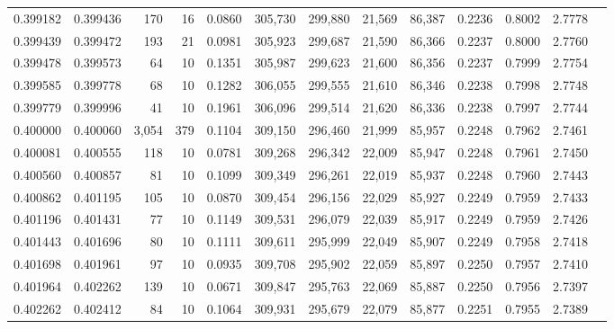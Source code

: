 \begin{tabular}{rrrrrrrrrrrrr}
0.399182 & 0.399436 &   170 &  16 &                                     0.0860 & 305,730 & 299,880 &  21,569 &  86,387 & 0.2236 & 0.8002 & 2.7778 \\
0.399439 & 0.399472 &   193 &  21 &                                     0.0981 & 305,923 & 299,687 &  21,590 &  86,366 & 0.2237 & 0.8000 & 2.7760 \\
0.399478 & 0.399573 &    64 &  10 &                                     0.1351 & 305,987 & 299,623 &  21,600 &  86,356 & 0.2237 & 0.7999 & 2.7754 \\
0.399585 & 0.399778 &    68 &  10 &                                     0.1282 & 306,055 & 299,555 &  21,610 &  86,346 & 0.2238 & 0.7998 & 2.7748 \\
0.399779 & 0.399996 &    41 &  10 &                                     0.1961 & 306,096 & 299,514 &  21,620 &  86,336 & 0.2238 & 0.7997 & 2.7744 \\
0.400000 & 0.400060 & 3,054 & 379 &                                     0.1104 & 309,150 & 296,460 &  21,999 &  85,957 & 0.2248 & 0.7962 & 2.7461 \\
0.400081 & 0.400555 &   118 &  10 &                                     0.0781 & 309,268 & 296,342 &  22,009 &  85,947 & 0.2248 & 0.7961 & 2.7450 \\
0.400560 & 0.400857 &    81 &  10 &                                     0.1099 & 309,349 & 296,261 &  22,019 &  85,937 & 0.2248 & 0.7960 & 2.7443 \\
0.400862 & 0.401195 &   105 &  10 &                                     0.0870 & 309,454 & 296,156 &  22,029 &  85,927 & 0.2249 & 0.7959 & 2.7433 \\
0.401196 & 0.401431 &    77 &  10 &                                     0.1149 & 309,531 & 296,079 &  22,039 &  85,917 & 0.2249 & 0.7959 & 2.7426 \\
0.401443 & 0.401696 &    80 &  10 &                                     0.1111 & 309,611 & 295,999 &  22,049 &  85,907 & 0.2249 & 0.7958 & 2.7418 \\
0.401698 & 0.401961 &    97 &  10 &                                     0.0935 & 309,708 & 295,902 &  22,059 &  85,897 & 0.2250 & 0.7957 & 2.7410 \\
0.401964 & 0.402262 &   139 &  10 &                                     0.0671 & 309,847 & 295,763 &  22,069 &  85,887 & 0.2250 & 0.7956 & 2.7397 \\
0.402262 & 0.402412 &    84 &  10 &                                     0.1064 & 309,931 & 295,679 &  22,079 &  85,877 & 0.2251 & 0.7955 & 2.7389 \\

\end{tabular}
